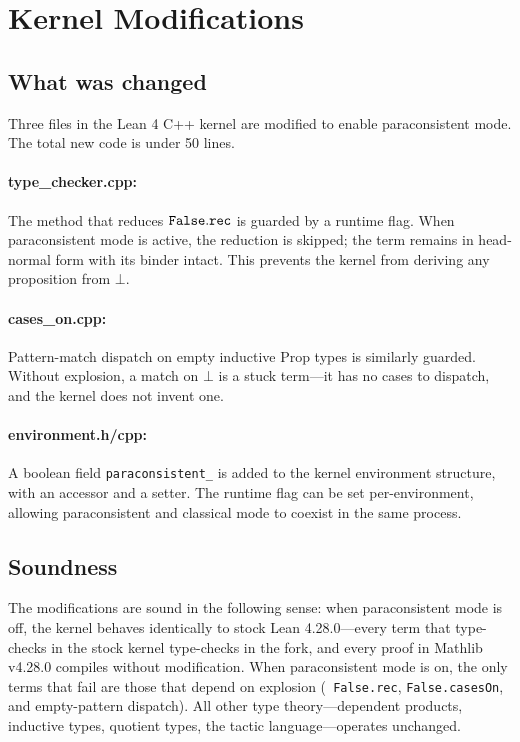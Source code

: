 \documentclass[11pt,a4paper]{article}
\theoremstyle{definition}
\begin{document}
\section{Kernel Modifications}

\subsection{What was changed}

Three files in the Lean 4 C++ kernel are modified to enable paraconsistent
mode. The total new code is under 50 lines.

\paragraph{type\_checker.cpp:} The method that reduces ${\tt False.rec}$ is
guarded by a runtime flag. When paraconsistent mode is active, the reduction
is skipped; the term remains in head-normal form with its binder intact. This
prevents the kernel from deriving any proposition from $\bot$.

\paragraph{cases\_on.cpp:} Pattern-match dispatch on empty inductive Prop
types is similarly guarded. Without explosion, a match on $\bot$ is a stuck
term---it has no cases to dispatch, and the kernel does not invent one.

\paragraph{environment.h/cpp:} A boolean field {\tt paraconsistent\_} is
added to the kernel environment structure, with an accessor and a setter.
The runtime flag can be set per-environment, allowing paraconsistent and
classical mode to coexist in the same process.

\subsection{Soundness}

The modifications are sound in the following sense: when paraconsistent mode
is off, the kernel behaves identically to stock Lean 4.28.0---every term that
type-checks in the stock kernel type-checks in the fork, and every proof in
Mathlib v4.28.0 compiles without modification. When paraconsistent mode is
on, the only terms that fail are those that depend on explosion ({\tt
False.rec}, {\tt False.casesOn}, and empty-pattern dispatch). All other type
theory---dependent products, inductive types, quotient types, the tactic
language---operates unchanged.
\end{document}
